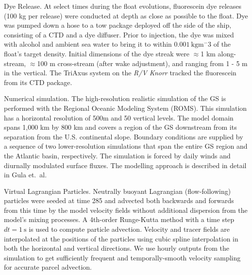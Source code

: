 \documentclass{article}
\begin{document}
Dye Release. At select times during the float evolutions, fluorescein dye releases (100 kg per release) were conducted at depth as close as possible to the float.  Dye was pumped down a hose to a tow package deployed off the side of the ship, consisting of a CTD and a dye diffuser.  Prior to injection, the dye was mixed with alcohol and ambient sea water to bring it to within $0.001\ \mathrm{kg m^-3}$ of the float's target density. Initial dimensions of the dye streak were $\approx$1 km along-stream, $\approx$100 m cross-stream (after wake adjustment), and ranging from 1 - 5 m in the vertical. The TriAxus system on the \emph{R/V Knorr} tracked the fluorescein from its CTD package.  

Numerical simulation. The high-resolution realistic simulation of the GS is performed with the Regional Oceanic Modeling System (ROMS\cite{shchepetkinmcwilliams05}). This simulation has a horizontal resolution of 500m and 50 vertical levels. The model domain spans 1,000 km by 800 km and covers a region of the GS downstream from its separation from the U.S. continental slope. Boundary conditions are supplied by a sequence of two lower-resolution simulations that span the entire GS region and the Atlantic basin, respectively. The simulation is forced by daily winds and diurnally modulated surface fluxes. The modelling approach is described in detail in Gula et.\ al\cite{gulaetal15}.

Virtual Lagrangian Particles.  Neutrally buoyant Lagrangian (flow-following) particles were seeded at time 285 and advected both backwards and forwards from this time by the model velocity fields without  additional dispersion from the model's mixing processes\cite{gulaetal14}. A 4th-order Runge-Kutta method with a  time step  $dt = 1\ \mathrm{s}$ is used to compute particle advection. Velocity and tracer fields are interpolated at the positions of the particles using cubic spline interpolation in both the horizontal and vertical directions.  We use hourly outputs from the simulation to get sufficiently frequent and temporally-smooth velocity sampling for accurate parcel advection.




\end{document}
